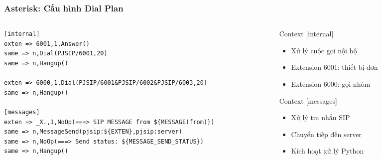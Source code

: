 \begin{frame}[fragile]
\frametitle{Asterisk: Cấu hình Dial Plan}

\begin{columns}[t]
\begin{column}{0.6\textwidth}
\begin{verbatim}
[internal]
exten => 6001,1,Answer()
same => n,Dial(PJSIP/6001,20)
same => n,Hangup()

exten => 6000,1,Dial(PJSIP/6001&PJSIP/6002&PJSIP/6003,20)
same => n,Hangup()

[messages]
exten => _X.,1,NoOp(===> SIP MESSAGE from ${MESSAGE(from)})
same => n,MessageSend(pjsip:${EXTEN},pjsip:server)
same => n,NoOp(===> Send status: ${MESSAGE_SEND_STATUS})
same => n,Hangup()
\end{verbatim}
\end{column}

\begin{column}{0.35\textwidth}
\begin{block}{Context [internal]}
\begin{itemize}
\item Xử lý cuộc gọi nội bộ
\item Extension 6001: thiết bị đơn
\item Extension 6000: gọi nhóm
\end{itemize}
\end{block}

\begin{exampleblock}{Context [messages]}
\begin{itemize}
\item Xử lý tin nhắn SIP
\item Chuyển tiếp đến server
\item Kích hoạt xử lý Python
\end{itemize}
\end{exampleblock}
\end{column}
\end{columns}

\end{frame}

